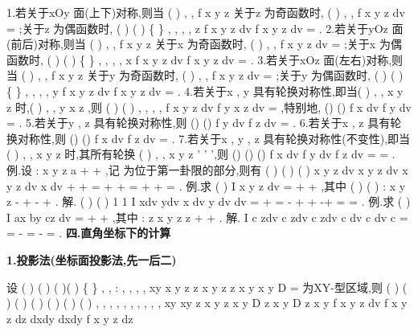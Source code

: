 1.若\Omega 关于xOy 面(上下)对称,则当
(
)
, ,
f x y z 关于z 为奇函数时, 
(
)
, ,
f x y z dv
\Omega 
=
\int \int \int 
;关于z 为偶函数时,
(
)
(
)
\{
\}
, ,
, ,
z
f x y z dv
f x y z dv
\Omega 
\Omega \cap 
\ge 
=
\int \int \int 
\int \int \int 
. 
2.若\Omega 关于yOz 面(前后)对称,则当
(
)
, ,
f x y z 关于x 为奇函数时, 
(
)
, ,
f x y z dv
\Omega 
=
\int \int \int 
;关于x 为偶函数时,
(
)
(
)
\{
\}
, ,
, ,
x
f x y z dv
f x y z dv
\Omega 
\Omega \cap 
\ge 
=
\int \int \int 
\int \int \int 
. 
3.若\Omega 关于xOz 面(左右)对称,则当
(
)
, ,
f x y z 关于y 为奇函数时, 
(
)
, ,
f x y z dv
\Omega 
=
\int \int \int 
;关于y 为偶函数时,
(
)
(
)
\{
\}
, ,
, ,
y
f x y z dv
f x y z dv
\Omega 
\Omega \cap 
\ge 
=
\int \int \int 
\int \int \int 
. 
4.若\Omega 关于x , y 具有轮换对称性,即当(
)
, ,
x y z \in \Omega 时,(
)
, ,
y x z \in \Omega ,则 
(
)
(
)
, ,
, ,
f x y z dv
f
y x z dv
\Omega 
\Omega 
=
\int \int \int 
\int \int \int 
,特别地,
()
()
f x dv
f
y dv
\Omega 
\Omega 
=
\int \int \int 
\int \int \int 
. 
5.若\Omega 关于y , z 具有轮换对称性,则
()
()
f
y dv
f z dv
\Omega 
\Omega 
=
\int \int \int 
\int \int \int 
. 
6.若\Omega 关于x , z 具有轮换对称性,则
()
()
f x dv
f z dv
\Omega 
\Omega 
=
\int \int \int 
\int \int \int 
. 
7.若\Omega 关于x , y , z 具有轮换对称性(不变性),即当(
)
, ,
x y z \in \Omega 时,其所有轮换 
(
)
,
,
x y z
'
'
'\in \Omega ,则
()
()
()
f x dv
f
y dv
f z dv
\Omega 
\Omega 
\Omega 
=
=
\int \int \int 
\int \int \int 
\int \int \int 
. 
\textcolor{lyred}{例}.设
: x
y
z
a
\Omega 
+
+
\le 
,记
\Omega 为\Omega 位于第一卦限的部分,则有 
(
)
(
)
(
)
x
y
z
dv
x
y
z
dv
x
y
z
dv
x dv
\Omega 
\Omega 
\Omega 
\Omega 
+
+
=
+
+
=
+
+
=
\int \int \int 
\int \int \int 
\int \int \int 
\int \int \int 
. 
\textcolor{lyred}{例}.求
(
)
I
x
y
z dv
\Omega 
=
+
+
\int \int \int 
,其中
(
)
(
)
:
x
y
z
\Omega 
-
+
-
+
\le . 
解.
(
)
(
)
1 1
I
xdv
ydv
x
dv
y
dv
dv
\pi 
\Omega 
\Omega 
\Omega 
\Omega 
\Omega 
=
+
=
-
+
+
-+
=
=
\int \int \int 
\int \int \int 
\int \int \int 
\int \int \int 
\int \int \int 
. 
\textcolor{lyred}{例}.求
(
)
I
ax
by
cz dv
\Omega 
=
+
+
\int \int \int 
,其中
:
z
x
y
z
z
\Omega 
\le 
+
+
\le 
. 
解.
I
c
zdv
c
zdv
c
zdv
c
dv
c
dv
c
\pi 
\Omega 
\Omega 
\Omega 
\Omega 
\Omega 
=
=
-
=
-
=
\int \int \int 
\int \int \int 
\int \int \int 
\int \int \int 
\int \int \int 
. 
\vspace{4pt}
{\bfseries \textcolor{lyred}{四.直角坐标下的计算}}

{\bfseries \textcolor{lyred}{1.投影法(坐标面投影法,先一后二)}}

设
(
)
(
)
(
)(
)
\{
\}
, ,
:
,
,
,
,
xy
x y z
z
x y
z
z
x y
x y
D
\Omega =
\le 
\le 
\in 
为XY-型区域,则 
(
)
(
)
(
)
(
)
(
)
(
)
(
)
,
,
,
,
, ,
, ,
, ,
xy
xy
z
x y
z
x y
D
z
x y
D
z
x y
f x y z dv
f x y z dz dxdy
dxdy
f x y z dz
\Omega 



